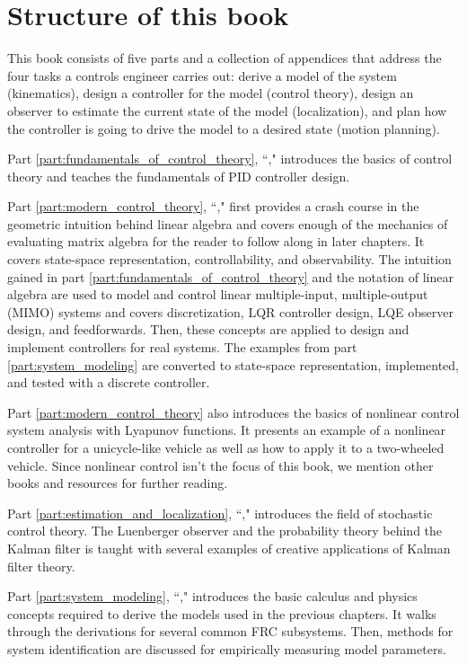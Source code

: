 \section{Structure of this book}

This book consists of five parts and a collection of appendices that address the
four tasks a controls engineer carries out: derive a model of the system
(kinematics), design a controller for the model (control theory), design an
observer to estimate the current state of the model (localization), and plan how
the controller is going to drive the model to a desired state (motion planning).

Part \ref{part:fundamentals_of_control_theory},
``," introduces the basics of
control theory and teaches the fundamentals of PID controller design.

Part \ref{part:modern_control_theory}, ``,"
first provides a crash course in the geometric intuition behind linear algebra
and covers enough of the mechanics of evaluating matrix algebra for the reader
to follow along in later chapters. It covers state-space representation,
controllability, and observability. The intuition gained in part
\ref{part:fundamentals_of_control_theory} and the notation of linear algebra are
used to model and control linear multiple-input, multiple-output (MIMO) systems
and covers discretization, LQR controller design, LQE observer design, and
feedforwards. Then, these concepts are applied to design and implement
controllers for real systems. The examples from part \ref{part:system_modeling}
are converted to state-space representation, implemented, and tested with a
discrete controller.

Part \ref{part:modern_control_theory} also introduces the basics of nonlinear
control system analysis with Lyapunov functions. It presents an example of a
nonlinear controller for a unicycle-like vehicle as well as how to apply it to a
two-wheeled vehicle. Since nonlinear control isn't the focus of this book, we
mention other books and resources for further reading.

Part \ref{part:estimation_and_localization},
``," introduces the field of
stochastic control theory. The Luenberger observer and the probability theory
behind the Kalman filter is taught with several examples of creative
applications of Kalman filter theory.

Part \ref{part:system_modeling}, ``," introduces
the basic calculus and physics concepts required to derive the models used in
the previous chapters. It walks through the derivations for several common FRC
subsystems. Then, methods for system identification are discussed for
empirically measuring model parameters.

